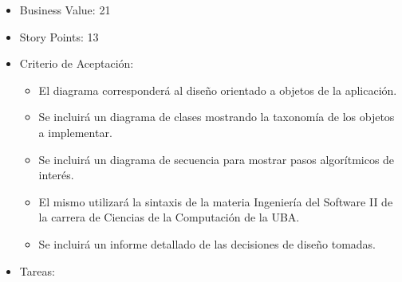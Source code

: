 \begin{enumerate}
  \begin{itemize}
  \itemsep1pt\parskip0pt
  \item
    Business Value: 21
  \item
    Story Points: 13
  \item
    Criterio de Aceptación:

    \begin{itemize}
    \itemsep1pt\parskip0pt
    \item
      El diagrama corresponderá al diseño orientado a objetos de la
      aplicación.
    \item
      Se incluirá un diagrama de clases mostrando la taxonomía de los
      objetos a implementar.
    \item
      Se incluirá un diagrama de secuencia para mostrar pasos
      algorítmicos de interés.
    \item
      El mismo utilizará la sintaxis de la materia Ingeniería del
      Software II de la carrera de Ciencias de la Computación de la UBA.
    \item
      Se incluirá un informe detallado de las decisiones de diseño
      tomadas.
    \end{itemize}
  \item
    Tareas:
  \end{itemize}


\end{enumerate}
